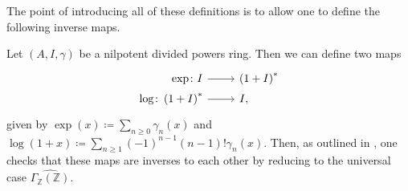 \documentclass[../Main]{subfiles}
\begin{document}
\noindent
The point of introducing all of these definitions is to allow one to define the following
inverse maps.
\begin{defn}[]
	Let $\left(A, I, \gamma\right)$ be a nilpotent divided powers ring.
	Then we can define two maps
	\begin{equation*}
	\begin{tikzcd}[row sep = 0ex
		,/tikz/column 1/.append style={anchor=base east}
		,/tikz/column 2/.append style={anchor=base west}]
		\exp\colon I \arrow[r, "", rightarrow] &
		\left( 1 + I \right)^*\\
		\log\colon \left( 1 + I \right)^* \arrow[r, "", rightarrow] &
		I
	,\end{tikzcd}
	\end{equation*} 
	given by 
	$\exp (x) \coloneqq \sum_{n\geq 0} \gamma_n(x)$
	and $\log (1+x) \coloneqq \sum_{n\geq 1} 
	(-1)^{n-1} \left( n-1 \right)! \gamma_n(x)$.
	Then, as outlined in \cite[Chapter III, \S1.6]{Messing},
	one checks that these maps are inverses to each other
	by reducing to the universal case $\widehat{\Gamma_{\mathbb{Z}}(\mathbb{Z})}$.
\end{defn}
\end{document}
